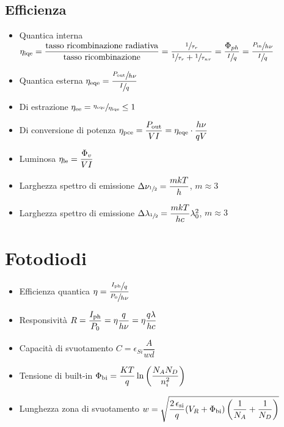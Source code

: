 \documentclass[9pt]{extarticle}
\begin{document}
\subsection{Efficienza}
\begin{itemize}
  \item Quantica interna \( \eta_{\textnormal{iqe}} = \dfrac{\textnormal{tasso ricombinazione radiativa}}{\textnormal{tasso ricombinazione}} = \dfrac{\sfrac{1}{\tau_r}}{\sfrac{1}{\tau_r} + \sfrac{1}{\tau_{nr}}} = \dfrac{\Phi_{ph}}{\sfrac{I}{q}} = \dfrac{\sfrac{P_{\textnormal{in}}}{h \nu}}{\sfrac{I}{q}}\)
  \item Quantica esterna \( \eta_{\textnormal{eqe}} = \dfrac{\sfrac{P_{\textnormal{out}}}{h \nu}}{\sfrac{I}{q}}\)
  \item Di estrazione \( \eta_{\textnormal{ee}} = \sfrac{ \eta_{\textnormal{eqe}}}{\eta_{\textnormal{iqe}}} \leq 1 \)
  \item Di conversione di potenza \( \eta_{\textnormal{pce}} = \dfrac{P_{\textnormal{out}}}{V I} = \eta_{\textnormal{eqe}} \cdot \dfrac{h \nu}{q V}\)
  \item Luminosa \( \eta_{\textnormal{le}} = \dfrac{\Phi_v}{V I} \)
  \item Larghezza spettro di emissione \( \Delta \nu_{\sfrac{1}{2}} = \dfrac{m k T}{h} \), \(m \approx 3 \)
  \item Larghezza spettro di emissione \( \Delta \lambda_{\sfrac{1}{2}} = \dfrac{m k T}{h c} \lambda_0^2 \), \(m \approx 3 \)
\end{itemize}

\newpage

\section{Fotodiodi}
\begin{itemize}
  \item Efficienza quantica \( \eta = \dfrac{\sfrac{I_{\textnormal{ph}}}{q}}{\sfrac{P_0}{h \nu}} \)
  \item Responsività \( R = \dfrac{I_{\textnormal{ph}}}{P_0} = \eta \dfrac{q}{h \nu} = \eta \dfrac{q \lambda}{h c} \)
  \item Capacità di svuotamento \( C = \epsilon_{Si} \dfrac{A}{w d} \)
  \item Tensione di built-in \( \Phi_{\textnormal{bi}} = \dfrac{KT}{q} \ln\left( \dfrac{N_A N_D}{n_i^ 2}\right) \)
  \item Lunghezza zona di svuotamento \( w = \sqrt{ \dfrac{2 \, \epsilon_{\textnormal{si}}}{q} (V_R +  \Phi_{\textnormal{bi}}) \left( \dfrac{1}{N_A} + \dfrac{1}{N_D} \right) } \)
\end{itemize}
\end{document}
